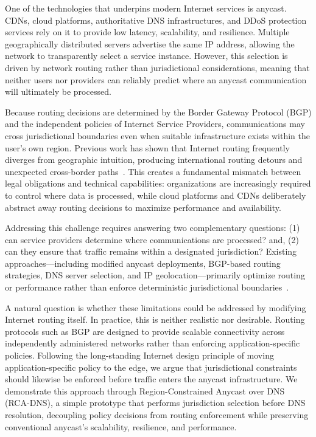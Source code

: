 \documentclass[acmsmall]{acmart}
\begin{document}
One of the technologies that underpins modern Internet services is anycast. CDNs, cloud platforms, authoritative DNS infrastructures, and DDoS protection services rely on it to provide low latency, scalability, and resilience. Multiple geographically distributed servers advertise the same IP address, allowing the network to transparently select a service instance. However, this selection is driven by network routing rather than jurisdictional considerations, meaning that neither users nor providers can reliably predict where an anycast communication will ultimately be processed.

Because routing decisions are determined by the Border Gateway Protocol (BGP) and the independent policies of Internet Service Providers, communications may cross jurisdictional boundaries even when suitable infrastructure exists within the user's own region. Previous work has shown that Internet routing frequently diverges from geographic intuition, producing international routing detours and unexpected cross-border paths~\cite{Comarela2016DetectingApplications, Shah2016TowardsDetours, Sun2021SecuringAttacks}. This creates a fundamental mismatch between legal obligations and technical capabilities: organizations are increasingly required to control where data is processed, while cloud platforms and CDNs deliberately abstract away routing decisions to maximize performance and availability.

Addressing this challenge requires answering two complementary questions: (1) can service providers determine where communications are processed? and, (2) can they ensure that traffic remains within a designated jurisdiction? Existing approaches—including modified anycast deployments, BGP-based routing strategies, DNS server selection, and IP geolocation—primarily optimize routing or performance rather than enforce deterministic jurisdictional boundaries~\cite{Zhu2022TheWorlds, Cozar2022ReliabilityTransfers}.

A natural question is whether these limitations could be addressed by modifying Internet routing itself. In practice, this is neither realistic nor desirable. Routing protocols such as BGP are designed to provide scalable connectivity across independently administered networks rather than enforcing application-specific policies. Following the long-standing Internet design principle of moving application-specific policy to the edge, we argue that jurisdictional constraints should likewise be enforced before traffic enters the anycast infrastructure. We demonstrate this approach through Region-Constrained Anycast over DNS (RCA-DNS), a simple prototype that performs jurisdiction selection before DNS resolution, decoupling policy decisions from routing enforcement while preserving conventional anycast's scalability, resilience, and performance.
\end{document}
